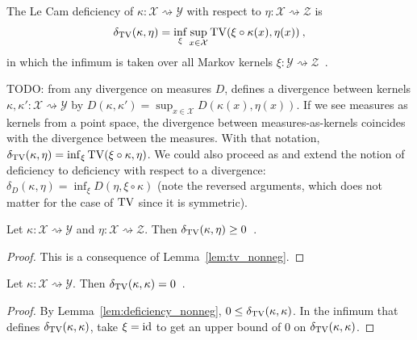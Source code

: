 \begin{definition}
  \label{def:deficiency}
  The Le Cam deficiency of $\kappa : \mathcal X \rightsquigarrow \mathcal Y$ with respect to $\eta : \mathcal X \rightsquigarrow \mathcal Z$ is
  \begin{align*}
  \delta_{\operatorname{TV}}(\kappa, \eta) = \inf_{\xi} \sup_{x \in \mathcal X} \operatorname{TV}(\xi \circ \kappa (x), \eta(x)) \: ,
  \end{align*}
  in which the infimum is taken over all Markov kernels $\xi : \mathcal Y \rightsquigarrow \mathcal Z$~.
\end{definition}

TODO: from any divergence on measures $D$, \cite{perrone2023markov} defines a divergence between kernels $\kappa, \kappa' : \mathcal X \rightsquigarrow \mathcal Y$ by $D(\kappa, \kappa') = \sup_{x \in \mathcal X} D(\kappa(x), \eta(x))$.
If we see measures as kernels from a point space, the divergence between measures-as-kernels coincides with the divergence between the measures.
With that notation, $\delta_{\operatorname{TV}}(\kappa, \eta) = \inf_{\xi} \operatorname{TV}(\xi \circ \kappa, \eta)$.
We could also proceed as \cite{raginsky2011shannon} and extend the notion of deficiency to deficiency with respect to a divergence: $\delta_D(\kappa, \eta) = \inf_{\xi} D(\eta, \xi\circ\kappa)$ (note the reversed arguments, which does not matter for the case of $\operatorname{TV}$ since it is symmetric).

\begin{lemma}
  \label{lem:deficiency_nonneg}
  Let $\kappa: \mathcal X \rightsquigarrow \mathcal Y$ and $\eta : \mathcal X \rightsquigarrow \mathcal Z$. Then $\delta_{\operatorname{TV}}(\kappa, \eta) \ge 0$~.
\end{lemma}

\begin{proof}%
{}
This is a consequence of Lemma~\ref{lem:tv_nonneg}.
\end{proof}

\begin{lemma}
  \label{lem:deficiency_self}
  Let $\kappa: \mathcal X \rightsquigarrow \mathcal Y$. Then $\delta_{\operatorname{TV}}(\kappa, \kappa) = 0$~.
\end{lemma}

\begin{proof}%
{}
By Lemma~\ref{lem:deficiency_nonneg}, $0 \le \delta_{\operatorname{TV}}(\kappa, \kappa)$.
In the infimum that defines $\delta_{\operatorname{TV}}(\kappa, \kappa)$, take $\xi = \textup{id}$ to get an upper bound of 0 on $\delta_{\operatorname{TV}}(\kappa, \kappa)$.
\end{proof}

